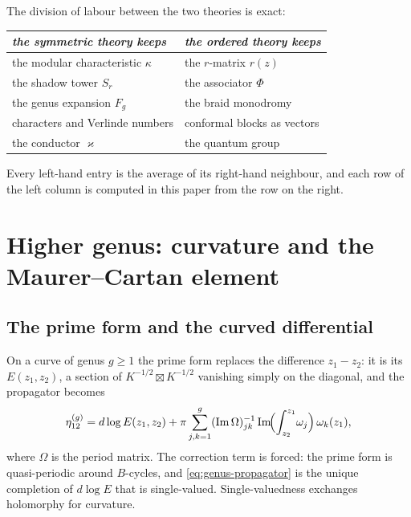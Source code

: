 \documentclass[11pt]{amsart}
\numberwithin{equation}{section}
\theoremstyle{plain}
\theoremstyle{definition}
\theoremstyle{remark}
\begin{document}
The division of labour between the two theories is exact:
\begin{center}
\begin{tabular}{ll}
\emph{the symmetric theory keeps} & \emph{the ordered theory keeps}\\
\hline
the modular characteristic $\kappa$ & the $r$-matrix $r(z)$\\
the shadow tower $S_r$ & the associator $\Phi$\\
the genus expansion $F_g$ & the braid monodromy\\
characters and Verlinde numbers & conformal blocks as vectors\\
the conductor $\varkappa$ & the quantum group
\end{tabular}
\end{center}
Every left-hand entry is the average of its right-hand neighbour, and
each row of the left column is computed in this paper from the row on
the right.

\section{Higher genus: curvature and the Maurer--Cartan element}
\label{sec:genus}

\subsection{The prime form and the curved differential}

On a curve of genus $g\geq1$ the prime form replaces the difference
$z_1-z_2$: it is its $E(z_1,z_2)$, a section of
$K^{-1/2}\boxtimes K^{-1/2}$ vanishing simply on the diagonal, and the
propagator becomes
\begin{equation}\label{eq:genus-propagator}
\eta^{(g)}_{12}
= d\log E(z_1,z_2)
+\pi\sum_{j,k=1}^{g}(\operatorname{Im}\Omega)^{-1}_{jk}
\operatorname{Im}\!\Bigl(\int_{z_2}^{z_1}\!\omega_j\Bigr)\,\omega_k(z_1),
\end{equation}
where $\Omega$ is the period matrix. The correction term is forced: the
prime form is quasi-periodic around $B$-cycles, and \eqref{eq:genus-propagator}
is the unique completion of $d\log E$ that is single-valued. Single-valuedness
exchanges holomorphy for curvature.
\end{document}
